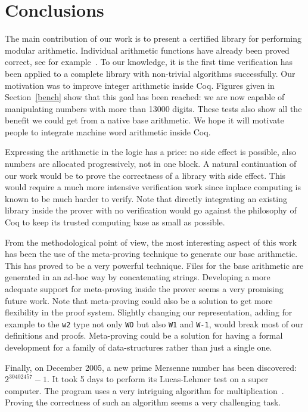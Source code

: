 \section{Conclusions}


The main contribution of our work is to present a certified library for performing
modular arithmetic. Individual arithmetic functions have already been proved correct,
see for example~\cite{BerMagZim02}. To our knowledge, it is the first time verification
has been applied to a complete library  with non-trivial algorithms successfully.
Our motivation was to improve integer arithmetic inside {\sc Coq}. Figures given in Section~\ref{bench} 
show that this goal has been reached: we are now capable of manipulating numbers with more than 13000 digits.
These tests also show all the benefit we could get from a native base arithmetic. We hope it will motivate people 
to integrate machine word arithmetic inside {\sc Coq}.

Expressing the arithmetic in the logic has a price: no side effect is possible, 
also numbers are allocated progressively, not in one block.
A natural continuation of our work would be to prove the correctness of a library with side effect.
This would require a much more intensive verification work since inplace computing
is known to be much harder to verify.
Note that directly integrating an existing library inside the prover with no verification
would go against the philosophy of {\sc Coq} to keep its trusted computing base as small
as possible.

From the methodological point of view, the most interesting aspect of this work
has been the use of the meta-proving technique to generate our base arithmetic. This has proved
to be a very powerful technique. Files for the base arithmetic are generated in an ad-hoc way
by concatenating strings. Developing a more adequate support for meta-proving inside the prover seems a
very promising future work. Note that meta-proving could also be a solution to get more flexibility
in the proof system. Slightly changing our representation, adding for example to  the {\tt w2} type not only {\tt WO}
but also {\tt W1} and {\tt W-1}, would break most of our definitions and proofs.
Meta-proving could be a solution for having a formal development for a family of data-structures rather than
just a single one.

Finally, on December 2005, a new prime Mersenne number has been discovered: $2 ^{30402457} - 1$.
It took 5 days to  perform its Lucas-Lehmer test on a super computer. 
The program uses a very intriguing algorithm for 
multiplication~\cite{crandall}. 
Proving the correctness of
such an algorithm seems a very challenging task. 
